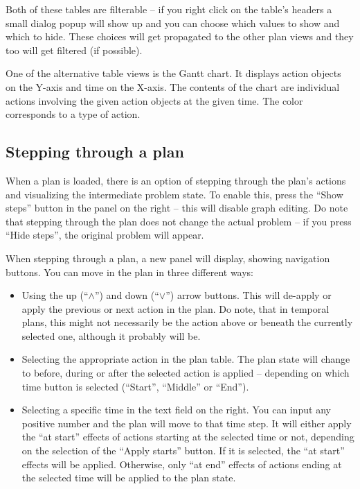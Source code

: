 Both of these tables are filterable -- if you right click on the table's headers a small dialog popup will show up
and you can choose which values to show and which to hide. These choices will get propagated to the other plan views
and they too will get filtered (if possible).

One of the alternative table views is the Gantt chart. It displays action objects on the Y-axis and time on the X-axis.
The contents of the chart are individual actions involving the given action objects at the given time. The color
corresponds to a type of action.

\subsection*{Stepping through a plan}
When a plan is loaded, there is an option of stepping through the plan's actions and visualizing the intermediate
problem state. To enable this, press the ``Show steps'' button in the panel on the right -- this will disable graph editing.
Do note that stepping through the plan does not change the
actual problem -- if you press ``Hide steps'', the original problem will appear.

When stepping through a plan, a new panel will display, showing navigation buttons.
You can move in the plan in three different ways:

\begin{itemize}

\item Using the up (``$\wedge$'') and down (``$\vee$'') arrow buttons. This will de-apply or apply the previous
or next action in the plan. Do note, that in temporal plans, this might not necessarily be the action
above or beneath the currently selected one, although it probably will be.

\item Selecting the appropriate action in the plan table. The plan state will change to before, during or after the
selected action is applied -- depending on which time button is selected (``Start'', ``Middle'' or ``End'').

\item Selecting a specific time in the text field on the right. You can input any positive number and the plan will move to
that time step. It will either apply the ``at start'' effects of actions starting at the selected time or not, depending
on the selection of the ``Apply starts'' button. If it is selected, the ``at start'' effects will be applied.
Otherwise, only ``at end'' effects of actions ending at the selected time will be applied to the plan state.

\end{itemize}

